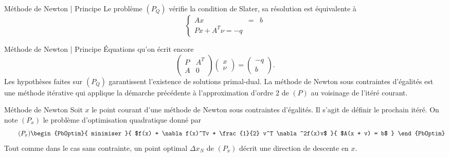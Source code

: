\documentclass[aspectratio = 169]{beamer}
\begin{document}
\begin{frame}{Méthode de Newton | Principe}
  Le problème $(P_Q)$ vérifie la condition de Slater, sa résolution
  est équivalente à
  \begin{equation}
    \label{KKT-PQ}
    \tag{KKT-$P_Q$}
    \left\{
      \begin{array}{ccc}
        Ax & = & b \\
        Px + A^T\nu = -q
      \end{array}
    \right.
  \end{equation}
\end{frame}

\begin{frame}{Méthode de Newton | Principe}
  Équations qu'on écrit encore
  \begin{equation}
    \label{KKT-PQb}
    \tag{KKT-$P_Q$}
    \begin{pmatrix}
      P & A^T \\
      A & 0
    \end{pmatrix}
    \begin{pmatrix}
      x \\ \nu
    \end{pmatrix}
    =
    \begin{pmatrix}
      -q \\ b
    \end{pmatrix}.
  \end{equation}
  Les hypothèses faites sur $(P_Q)$ garantissent l'existence de
  solutions primal-dual. \pause La méthode de Newton sous contraintes
  d'égalités est une méthode itérative qui applique la démarche
  précédente à l'approximation d'ordre $2$ de $(P)$ au voisinage de
  l'itéré courant.
\end{frame}

\begin{frame}{Méthode de Newton}
  Soit $x$ le point courant d'une méthode de Newton sous contraintes
  d'égalités. Il s'agit de définir le prochain itéré. \pause On note
  $(P_x)$ le problème d'optimisation quadratique donné par
  \begin{equation}
    \label{Px}
    \tag{$P_x$}
    \begin{PbOptim}{
        minimiser
      }{
        $f(x) + \nabla f(x)^Tv + \frac{1}{2} v^T \nabla^2f(x)v$
      }{
        $A(x + v) = b$
      }
    \end{PbOptim}
  \end{equation}
  \pause Tout comme dans le cas sans contrainte, un point optimal
  $\Delta x_N$ de $(P_x)$ décrit une direction de descente en $x$.
\end{frame}
\end{document}
